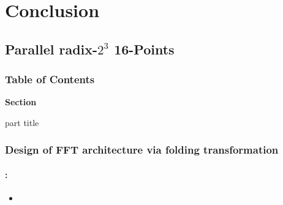 \section{Conclusion}
\subsection{Parallel radix-$2^3$ 16-Points}
\begin{frame}
  \frametitle{\textbf{Table of Contents}}
  \begin{center}
    {\vspace{-1.5cm}\Large \textbf{Section \thesection}\vspace{0.5cm}}
    \begin{beamercolorbox}[
      sep=8pt,center]{part title}
      \textbf{\insertsection}
    \end{beamercolorbox}
  \end{center}
\end{frame}



\begin{frame}
	\frametitle{\textbf{Design of FFT architecture via folding transformation}}
	\framesubtitle{\secname : \subsecname}
	\begin{block}{\centering \textbf{}}
		\begin{itemize}\justifying\footnotesize
        	\item 	 
		\end{itemize}	
	\end{block}
\end{frame}